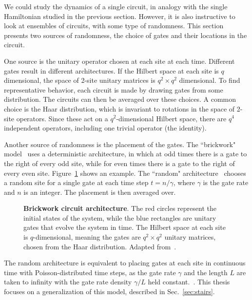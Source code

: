 We could study the dynamics of a single circuit, in analogy with the single Hamiltonian studied in the previous section. However, it is also instructive to look at ensembles of circuits, with some type of randomness. This section presents two sources of randomness, the choice of gates and their locations in the circuit.

One source is the unitary operator chosen at each site at each time. Different gates result in different architectures. 
If the Hilbert space at each site is $q$ dimensional, the space of 2-site unitary matrices is $q^2\times q^2$ dimensional. To find representative behavior, each circuit is made by drawing gates from some distribution. The circuits can then be averaged over these choices. A common choice is the Haar distribution, which is invariant to rotations in the space of 2-site operators. Since these act on a $q^2$-dimensional Hilbert space, there are $q^4$ independent operators, including one trivial operator (the identity). 

Another source of randomness is the placement of the gates. The ``brickwork" model~\cite{Keyserlingk} uses a deterministic architecture, in which at odd times there is a gate to the right of every odd site, while for even times there is a gate to the right of every even site. Figure~\ref{fig:brickcircuit} shows an example. The ``random" architecture~\cite{Nahum2017} chooses a random site for a single gate at each time step $t = n/\gamma$, where $\gamma$ is the gate rate and $n$ is an integer. The placement is then averaged over. 

\begin{figure}
	\centering
	
	\caption{\textbf{Brickwork circuit architecture}. The red circles represent the initial states of the system, while the blue rectangles are unitary gates that evolve the system in time. The Hilbert space at each site is $q$-dimensional, meaning the gates are $q^2\times q^2$ unitary  matrices, chosen from the Haar distribution. Adapted from~\cite{Keyserlingk}.}
	\label{fig:brickcircuit}
\end{figure}

The random architecture is equivalent to placing gates at each site in continuous time with Poisson-distributed time steps, as the gate rate $\gamma$ and the length $L$ are taken to infinity with the gate rate density $\gamma/L$ held constant.~\cite{Nahum2017}. This thesis focuses on a generalization of this model, described in Sec.~\ref{sec:stairs}.

